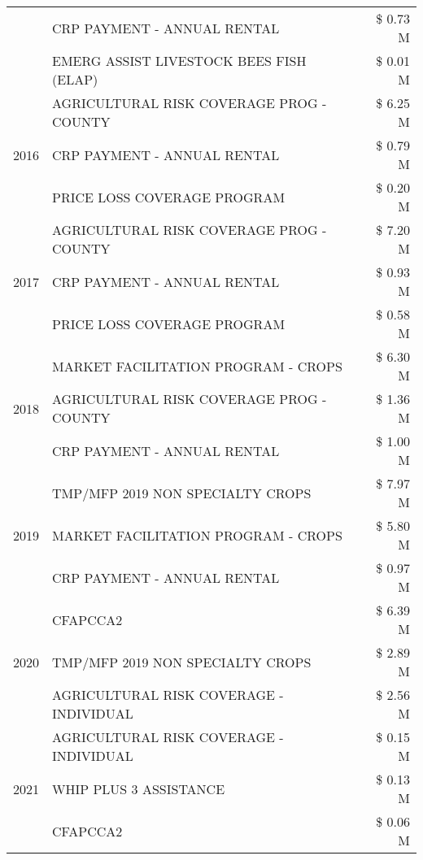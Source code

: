 \begin{tabular}{llr}
 & CRP PAYMENT - ANNUAL RENTAL & \$ 0.73 M \\
 & EMERG ASSIST LIVESTOCK BEES FISH (ELAP) & \$ 0.01 M \\
\cline{1-3}
\multirow[t]{3}{*}{2016} & AGRICULTURAL RISK COVERAGE PROG - COUNTY & \$ 6.25 M \\
 & CRP PAYMENT - ANNUAL RENTAL & \$ 0.79 M \\
 & PRICE LOSS COVERAGE PROGRAM & \$ 0.20 M \\
\cline{1-3}
\multirow[t]{3}{*}{2017} & AGRICULTURAL RISK COVERAGE PROG - COUNTY & \$ 7.20 M \\
 & CRP PAYMENT - ANNUAL RENTAL & \$ 0.93 M \\
 & PRICE LOSS COVERAGE PROGRAM & \$ 0.58 M \\
\cline{1-3}
\multirow[t]{3}{*}{2018} & MARKET FACILITATION PROGRAM - CROPS & \$ 6.30 M \\
 & AGRICULTURAL RISK COVERAGE PROG - COUNTY & \$ 1.36 M \\
 & CRP PAYMENT - ANNUAL RENTAL & \$ 1.00 M \\
\cline{1-3}
\multirow[t]{3}{*}{2019} & TMP/MFP 2019 NON SPECIALTY CROPS & \$ 7.97 M \\
 & MARKET FACILITATION PROGRAM - CROPS & \$ 5.80 M \\
 & CRP PAYMENT - ANNUAL RENTAL & \$ 0.97 M \\
\cline{1-3}
\multirow[t]{3}{*}{2020} & CFAPCCA2 & \$ 6.39 M \\
 & TMP/MFP 2019 NON SPECIALTY CROPS & \$ 2.89 M \\
 & AGRICULTURAL RISK COVERAGE - INDIVIDUAL & \$ 2.56 M \\
\cline{1-3}
\multirow[t]{3}{*}{2021} & AGRICULTURAL RISK COVERAGE - INDIVIDUAL & \$ 0.15 M \\
 & WHIP PLUS 3 ASSISTANCE & \$ 0.13 M \\
 & CFAPCCA2 & \$ 0.06 M \\
\cline{1-3}
\bottomrule
\end{tabular}
